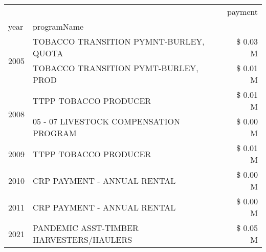 \begin{tabular}{llr}
\toprule
 &  & payment \\
year & programName &  \\
\midrule
\multirow[t]{2}{*}{2005} & TOBACCO TRANSITION PYMNT-BURLEY, QUOTA & \$ 0.03 M \\
 & TOBACCO TRANSITION PYMT-BURLEY, PROD & \$ 0.01 M \\
\cline{1-3}
\multirow[t]{2}{*}{2008} & TTPP TOBACCO PRODUCER & \$ 0.01 M \\
 & 05 - 07 LIVESTOCK COMPENSATION PROGRAM & \$ 0.00 M \\
\cline{1-3}
2009 & TTPP TOBACCO PRODUCER & \$ 0.01 M \\
\cline{1-3}
2010 & CRP PAYMENT - ANNUAL RENTAL & \$ 0.00 M \\
\cline{1-3}
2011 & CRP PAYMENT - ANNUAL RENTAL & \$ 0.00 M \\
\cline{1-3}
2021 & PANDEMIC ASST-TIMBER HARVESTERS/HAULERS & \$ 0.05 M \\
\cline{1-3}
\bottomrule
\end{tabular}

